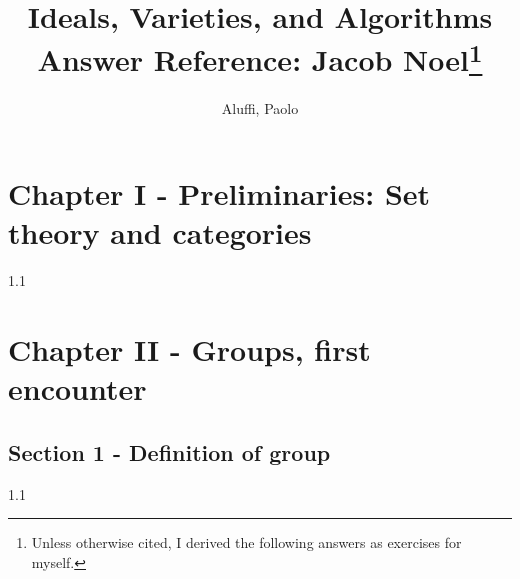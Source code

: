 \documentclass[letterpaper,12pt]{article}
\theoremstyle{definition}
\begin{document}
\title{Ideals, Varieties, and Algorithms \\ {\small Answer Reference: Jacob Noel\footnote{Unless otherwise cited, I derived the following answers as exercises for myself.}}}
\author{Aluffi, Paolo}


{\let\newpage\relax\maketitle}


\pagebreak
\section*{Chapter I - Preliminaries: Set theory and categories}

\begin{flushleft}
	1.1
\end{flushleft}


\pagebreak

\section*{Chapter II - Groups, first encounter}

\subsection*{Section 1 - Definition of group}

\begin{flushleft}
	1.1
\end{flushleft}
\end{document}

